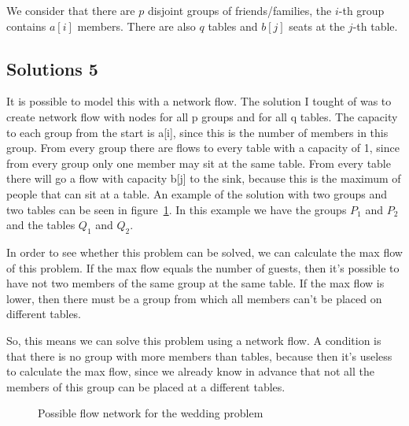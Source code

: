 \documentclass{article}
\begin{document}
We consider that there are $p$ disjoint groups of friends/families, the $i$-th group contains $a[i]$ members.
There are also $q$ tables and $b[j]$ seats at the $j$-th table.

\subsection*{Solutions 5}
It is possible to model this with a network flow. The solution I tought of was to create network flow with nodes for all p groups and for all q tables. The capacity to each group from the start is a[i], since this is the number of members in this group. From every group there are flows to every table with a capacity of 1, since from every group only one member may sit at the same table. From every table there will go a flow with capacity b[j] to the sink, because this is the maximum of people that can sit at a table. An example of the solution with two groups and two tables can be seen in figure~\ref{fig:M5}. In this example we have the groups $P_1$ and $P_2$ and the tables $Q_1$ and $Q_2$.

In order to see whether this problem can be solved, we can calculate the max flow of this problem. If the max flow equals the number of guests, then it's possible to have not two members of the same group at the same table. If the max flow is lower, then there must be a group from which all members can't be placed on different tables.

So, this means we can solve this problem using a network flow. A condition is that there is no group with more members than tables, because then it's useless to calculate the max flow, since we already know in advance that not all the members of this group can be placed at a different tables.

\begin{figure}[hb]
    \centering
    \caption{Possible flow network for the wedding problem} \label{fig:M5}
\end{figure}
\end{document}

